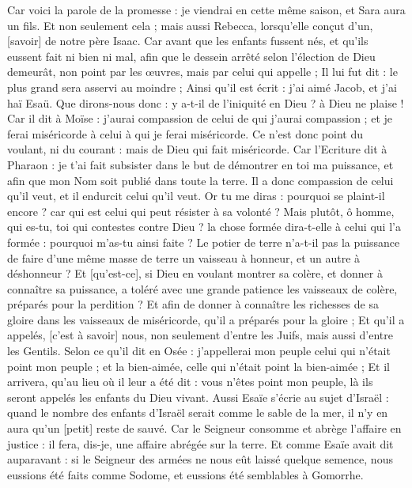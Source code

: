\begin{multicols}{2}
Car voici la parole de la promesse : je viendrai en cette même saison, et Sara aura un fils.
Et non seulement cela ; mais aussi Rebecca, lorsqu'elle conçut d'un, [savoir] de notre père Isaac.
Car avant que les enfants fussent nés, et qu'ils eussent fait ni bien ni mal, afin que le dessein arrêté selon l'élection de Dieu demeurât, non point par les œuvres, mais par celui qui appelle ;
Il lui fut dit : le plus grand sera asservi au moindre ;
Ainsi qu'il est écrit : j'ai aimé Jacob, et j'ai haï Esaü.
Que dirons-nous donc : y a-t-il de l'iniquité en Dieu ? à Dieu ne plaise !
Car il dit à Moïse : j'aurai compassion de celui de qui j'aurai compassion ; et je ferai miséricorde à celui à qui je ferai miséricorde.
Ce n'est donc point du voulant, ni du courant : mais de Dieu qui fait miséricorde.
Car l'Ecriture dit à Pharaon : je t'ai fait subsister dans le but de démontrer en toi ma puissance, et afin que mon Nom soit publié dans toute la terre.
Il a donc compassion de celui qu'il veut, et il endurcit celui qu'il veut.
Or tu me diras : pourquoi se plaint-il encore ? car qui est celui qui peut résister à sa volonté ?
Mais plutôt, ô homme, qui es-tu, toi qui contestes contre Dieu ? la chose formée dira-t-elle à celui qui l'a formée : pourquoi m'as-tu ainsi faite ?
Le potier de terre n'a-t-il pas la puissance de faire d'une même masse de terre un vaisseau à honneur, et un autre à déshonneur ?
Et [qu'est-ce], si Dieu en voulant montrer sa colère, et donner à connaître sa puissance, a toléré avec une grande patience les vaisseaux de colère, préparés pour la perdition ?
Et afin de donner à connaître les richesses de sa gloire dans les vaisseaux de miséricorde, qu'il a préparés pour la gloire ;
Et qu'il a appelés, [c'est à savoir] nous, non seulement d'entre les Juifs, mais aussi d'entre les Gentils.
Selon ce qu'il dit en Osée : j'appellerai mon peuple celui qui n'était point mon peuple ; et la bien-aimée, celle qui n'était point la bien-aimée ;
Et il arrivera, qu'au lieu où il leur a été dit : vous n'êtes point mon peuple, là ils seront appelés les enfants du Dieu vivant.
Aussi Esaïe s'écrie au sujet d'Israël : quand le nombre des enfants d'Israël serait comme le sable de la mer, il n'y en aura qu'un [petit] reste de sauvé.
Car le Seigneur consomme et abrège l'affaire en justice : il fera, dis-je, une affaire abrégée sur la terre.
Et comme Esaïe avait dit auparavant : si le Seigneur des armées ne nous eût laissé quelque semence, nous eussions été faits comme Sodome, et eussions été semblables à Gomorrhe.

\end{multicols}
